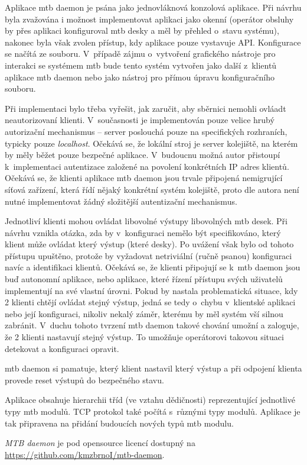 Aplikace \gls{mtb} daemon je psána jako jednovláknová konzolová aplikace.
Při návrhu byla zvažována i možnost implementovat aplikaci jako okenní
(operátor obsluhy by přes aplikaci konfiguroval \gls{mtb} desky a měl by
přehled o~stavu systému), nakonec byla však zvolen přístup, kdy aplikace pouze
vystavuje API. Konfigurace se načítá ze souboru. V~případě zájmu o~vytvoření
grafického nástroje pro interakci se systémem \gls{mtb} bude tento systém
vytvořen jako další z~klientů aplikace \gls{mtb} daemon nebo jako nástroj pro
přímou úpravu konfiguračního souboru.

Při implementaci bylo třeba vyřešit, jak zaručit, aby sběrnici nemohli ovláadt
neautorizovaní klienti. V~současnosti je implementován pouze velice hrubý
autorizační mechanismus – server poslouchá pouze na specifických rozhraních,
typicky pouze \textit{localhost}. Očekává se, že lokální stroj je server
kolejiště, na kterém by měly běžet pouze bezpečné aplikace. V~budoucnu možná
autor přistoupí k~implementaci autentizace založené na povolení konkrétních
IP adres klientů. Očekává se, že klienti aplikace \gls{mtb} daemon jsou trvale
připojená nemigrující síťová zařízení, která řídí nějaký konkrétní systém
kolejiště, proto dle autora není nutné implementovat žádný složitější
autentizační mechanismus.

Jednotliví klienti mohou ovládat libovolné výstupy libovolných \gls{mtb} desek.
Při návrhu vznikla otázka, zda by v~konfiguraci nemělo být specifikováno,
který klient může ovládat který výstup (které desky). Po uvážení však bylo od
tohoto přístupu upuštěno, protože by vyžadovat netriviální (ručně psanou)
konfiguraci navíc a identifikaci klientů. Očekává se, že klienti připojují
se k~\gls{mtb} daemon jsou buď autonomní aplikace, nebo aplikace, které řízení
přístupu svých uživatelů implementují na své vlastní úrovni. Pokud by nastala
problematická situace, kdy 2 klienti chtějí ovládat stejný výstup, jedná se
tedy o~chybu v~klientské aplikaci nebo její konfiguraci, nikoliv nekalý záměr,
kterému by měl systém vší silnou zabránit. V~duchu tohoto tvrzení \gls{mtb} daemon
takové chování umožní a zaloguje, že 2 klienti nastavují stejný výstup. To
umožňuje operátorovi takovou situaci detekovat a konfiguraci opravit.

\gls{mtb} daemon si pamatuje, který klient nastavil který výstup a při odpojení
klienta provede reset výstupů do bezpečného stavu.

Aplikace obsahuje hierarchii tříd (ve vztahu dědičnosti) reprezentující
jednotlivé typy \gls{mtb} modulů. TCP protokol také počítá s~různými typy
modulů. Aplikace je tak připravena na přidání budoucích nových typů \gls{mtb}
modulu.

\textit{MTB daemon} je pod opensource licencí dostupný na
\url{https://github.com/kmzbrnoI/mtb-daemon}.
